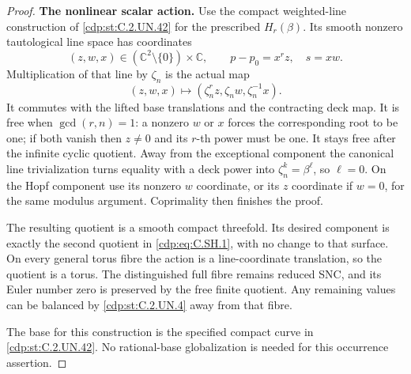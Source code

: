 \begin{proof}
\par\medskip\noindent\textbf{The nonlinear scalar action.}
Use the compact weighted-line construction of \ref{cdp:st:C.2.UN.42}
for the prescribed $H_r(\beta)$. Its smooth nonzero
tautological line space has coordinates
\[
 (z,w,x)\in(\mathbb C^2\setminus\{0\})\times\mathbb C,
                   \qquad p-p_0=x^r z,\quad s=xw.
\tag{C.SH.12}\label{cdp:eq:C.SH.12}
\]
Multiplication of that line by $\zeta_n$ is the actual map
\[
 (z,w,x)\longmapsto
       (\zeta_n^r z,\zeta_n w,\zeta_n^{-1}x).
\tag{C.SH.13}\label{cdp:eq:C.SH.13}
\]
It commutes with the lifted base translations and the
contracting deck map. It is free when $\gcd(r,n)=1$:
a nonzero $w$ or $x$ forces the corresponding root to be
one; if both vanish then $z\ne0$ and its $r$-th power
must be one. It stays free after the infinite cyclic
quotient. Away from the exceptional component the
canonical line trivialization turns equality with a
deck power into $\zeta_n^k=\beta^\ell$, so $\ell=0$.
On the Hopf component use its nonzero $w$ coordinate,
or its $z$ coordinate if $w=0$, for the same modulus
argument. Coprimality then finishes the proof.

The resulting quotient is a smooth compact threefold.
Its desired component is exactly the second quotient
in \eqref{cdp:eq:C.SH.1}, with no change to that surface. On every
general torus fibre the action is a line-coordinate
translation, so the quotient is a torus. The distinguished
full fibre remains reduced SNC, and its Euler number
zero is preserved by the free finite quotient. Any
remaining values can be balanced by \ref{cdp:st:C.2.UN.4} away
from that fibre.

The base for this construction is the specified compact
curve in \ref{cdp:st:C.2.UN.42}. No rational-base globalization is
needed for this occurrence assertion.
\end{proof}


